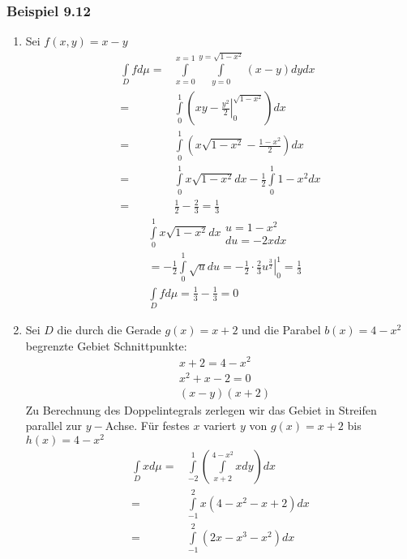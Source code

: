 \subsubsection*{Beispiel 9.12}
\begin{enumerate}
\item Sei $f\left( x,y\right)=x-y$
\begin{align*}
\int\limits_D fd\mu =&\int\limits_{x=0}^{x=1}\int\limits_{y=0}^{y=\sqrt{1-x^2}}\left( x-y\right) dy dx\\
 =&\int\limits_0^1 {\left( {\left. {xy - \frac{{{y^2}}}{2}} \right|_0^{\sqrt {1 - {x^2}} }} \right)} dx\\
=&\int\limits_0^1 {\left( {x\sqrt {1 - {x^2}}  - \frac{{1 - {x^2}}}{2}} \right)dx}\\
=&\int\limits_0^1 {x\sqrt {1 - {x^2}} } dx - \frac{1}{2}\int\limits_0^1 {1 - {x^2}dx}\\
 =&\frac{1}{2} - \frac{2}{3} = \frac{1}{3}
\end{align*}
\begin{align*}
&\int\limits_0^1 {x\sqrt {1 - {x^2}} dx} \begin{array}{*{20}{c}}
{u = 1 - {x^2}}\\
{du =  - 2xdx}
\end{array}\\
&=  - \frac{1}{2}\int\limits_0^1 {\sqrt u du}  = \left. { - \frac{1}{2} \cdot \frac{2}{3}{u^{\frac{3}{2}}}} \right|_0^1 = \frac{1}{3}\\
&\int\limits_D {fd\mu  = \frac{1}{3} - \frac{1}{3} = 0} 
\end{align*}
\item Sei $D$  die durch die Gerade $g(x)=x+2$ und die Parabel $b(x)=4-x^2$ begrenzte Gebiet
Schnittpunkte:
\begin{align*}
&x+2=4-x^2\\
&x^2+x-2=0\\
&\left( x-y\right)\left( x+2\right)
\end{align*}
Zu Berechnung des Doppelintegrals zerlegen wir das Gebiet in Streifen parallel zur $y-$Achse. Für festes $x$ variert $y$ von $g(x)=x+2$ bis $h(x)=4-x^2$
\begin{align*}
\int\limits_D xd\mu  =&\int\limits_{ - 2}^1 {\left( {\int\limits_{x + 2}^{4 - {x^2}} {xdy} } \right)dx} \\
 =&\int\limits_{ - 1}^2 {x\left( {4 - {x^2} - x + 2} \right)dx}\\
 =&\int\limits_{ - 1}^2 {\left( {2x - {x^3} - {x^2}} \right)dx} \\

\end{align*}
\end{enumerate}
